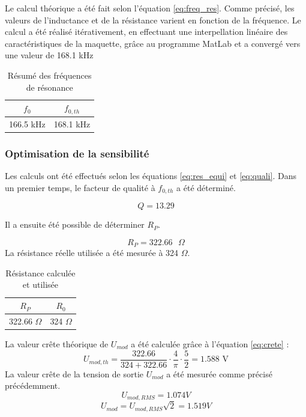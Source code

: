\vspace{0,2cm}

Le calcul théorique a été fait selon l'équation \ref{eq:freq_res}.
Comme précisé, les valeurs de l'inductance et de la résistance varient en fonction de la fréquence.
Le calcul a été réalisé itérativement, en effectuant une interpellation linéaire des caractéristiques
de la maquette, grâce au programme MatLab et a convergé vers une valeur de 168.1 kHz 

\begin{table}[H]
    \centering
    \begin{tabular}{|c|c|}
        \hline
    $f_0$    & $f_{0,th}$  \\ \hline
    166.5 kHz & 168.1 kHz \\ \hline
    \end{tabular}
    \caption{Résumé des fréquences de résonance}
    \label{tab:freq_res}
\end{table}

\subsubsection{Optimisation de la sensibilité}

Les calculs ont été effectués selon les équations \ref{eq:res_equi} et \ref{eq:quali}. Dans un premier
temps, le facteur de qualité à $f_{0,th}$ a été déterminé.

\begin{equation*}
    Q=13.29
\end{equation*}

Il a ensuite été possible de déterminer $R_P$.

\begin{equation*}
    R_P=322.66 \text{ }\Omega
\end{equation*}
La résistance réelle utilisée a été mesurée à 324 $\Omega$.
\vspace{0,2cm}

\begin{table}[H]
    \centering
    \begin{tabular}{|c|c|}
    \hline
    $R_P$     & $R_0$  \\ \hline
    322.66 $\Omega$ & 324 $\Omega$ \\ \hline
    \end{tabular}
    \caption{Résistance calculée et utilisée}
    \label{tab:Resi}
    \end{table}

La valeur crête théorique de $U_{mod}$ a été calculée grâce à l'équation \ref{eq:crete} :
\begin{equation*}
    U_{mod,th} = \frac{322.66}{324+322.66}\cdot\frac{4}{\pi}\cdot \frac{5}{2} = 1.588\text{ V}
\end{equation*} 
\vspace{0,2cm}
La valeur crête de la tension de sortie $U_{mod}$ a été mesurée comme précisé précédemment.
\begin{equation*}
    U_{mod,RMS} = 1.074{ V}
\end{equation*} 
\begin{equation*}
    U_{mod} = U_{mod,RMS}\sqrt{2} = 1.519{ V}
\end{equation*} 


